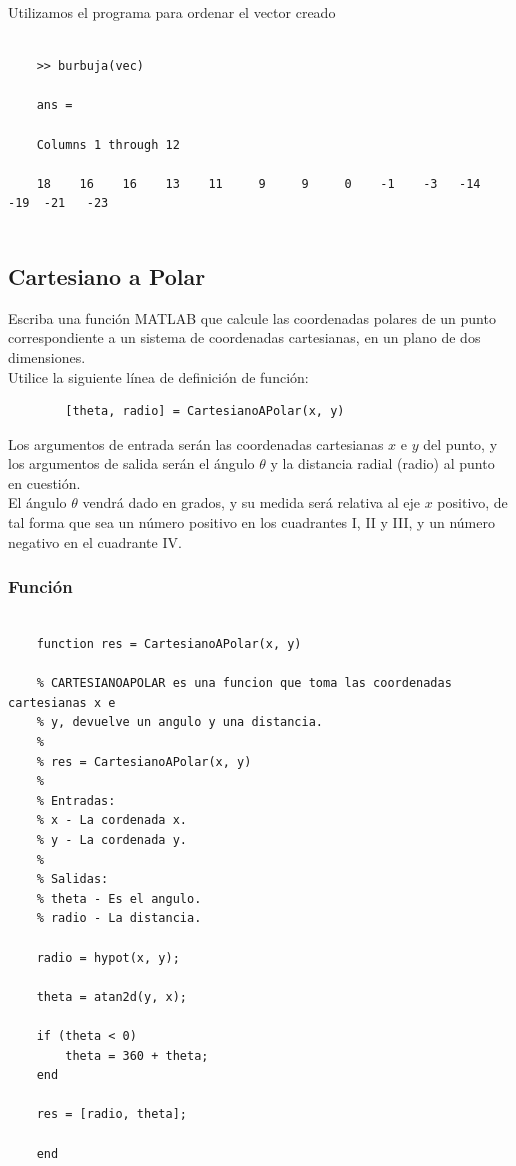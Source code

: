 \documentclass{article}
\begin{document}
	Utilizamos el programa para ordenar el vector creado
	\\
	
	\begin{lstlisting}
		
	>> burbuja(vec)
	
	ans =
	
	Columns 1 through 12
	
	18    16    16    13    11     9     9     0    -1    -3   -14   -19  -21   -23
	
	\end{lstlisting}
	\newpage
	
	\subsection{Cartesiano a Polar}
	
	Escriba una función MATLAB que calcule las coordenadas polares de un punto correspondiente a un sistema de coordenadas cartesianas, en un plano de dos dimensiones.\\
	
	Utilice la siguiente línea de definición de función:
	
	\begin{verbatim}
		[theta, radio] = CartesianoAPolar(x, y)
	\end{verbatim}
	
	Los argumentos de entrada serán las coordenadas cartesianas $x$ e $y$ del punto, y los argumentos de salida serán el ángulo $\theta$ y la distancia radial (radio) al punto en cuestión.\\
	
	El ángulo $\theta$ vendrá dado en grados, y su medida será relativa al eje $x$ positivo, de tal forma que sea un número positivo en los cuadrantes I, II y III, y un número negativo en el cuadrante IV.\\
	
	\subsubsection{Función}
	
	\begin{lstlisting}
	
	function res = CartesianoAPolar(x, y)
	
	% CARTESIANOAPOLAR es una funcion que toma las coordenadas cartesianas x e
	% y, devuelve un angulo y una distancia.
	%
	% res = CartesianoAPolar(x, y)
	%
	% Entradas:
	% x - La cordenada x.
	% y - La cordenada y.
	% 
	% Salidas:
	% theta - Es el angulo.
	% radio - La distancia.
	
	radio = hypot(x, y);
	
	theta = atan2d(y, x);
	
	if (theta < 0)
		theta = 360 + theta;
	end
	
	res = [radio, theta];
	
	end
	
	\end{lstlisting}
	
\end{document}
